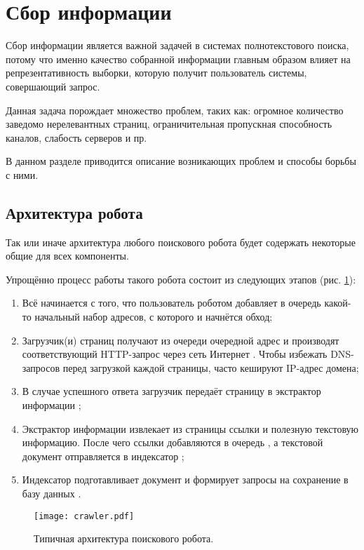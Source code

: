 \section{Сбор информации}
Сбор информации является важной задачей в системах полнотекстового поиска, потому что именно качество собранной информации главным образом влияет на репрезентативность выборки, которую получит пользователь системы, совершающий запрос.

Данная задача порождает множество проблем, таких как: огромное количество заведомо нерелевантных страниц, ограничительная пропускная способность каналов, слабость серверов и пр.

В данном разделе приводится описание возникающих проблем и способы борьбы с ними.


\subsection{Архитектура робота}
Так или иначе архитектура любого поискового робота будет содержать некоторые общие для всех компоненты.

Упрощённо процесс работы такого робота состоит из следующих этапов (рис. \ref{fig:crawler}):
\begin{enumerate}
  \item Всё начинается с того, что пользователь роботом  добавляет в очередь  какой-то начальный набор адресов, с которого и начнётся обход;
  \item Загрузчик(и) страниц  получают из очереди  очередной адрес и производят соответствующий HTTP-запрос через сеть Интернет . Чтобы избежать DNS-запросов перед загрузкой каждой страницы, часто кешируют IP-адрес домена;
  \item В случае успешного ответа загрузчик  передаёт страницу в экстрактор информации ;
  \item Экстрактор информации  извлекает из страницы ссылки и полезную текстовую информацию. После чего ссылки добавляются в очередь , а текстовой документ отправляется в индексатор ;
  \item Индексатор  подготавливает документ и формирует запросы на сохранение в базу данных .
\end{enumerate}

\begin{figure}[h]
  \centering
  \texttt{[image: crawler.pdf]}
  \caption{Типичная архитектура поискового робота.}
  \label{fig:crawler}
\end{figure}


